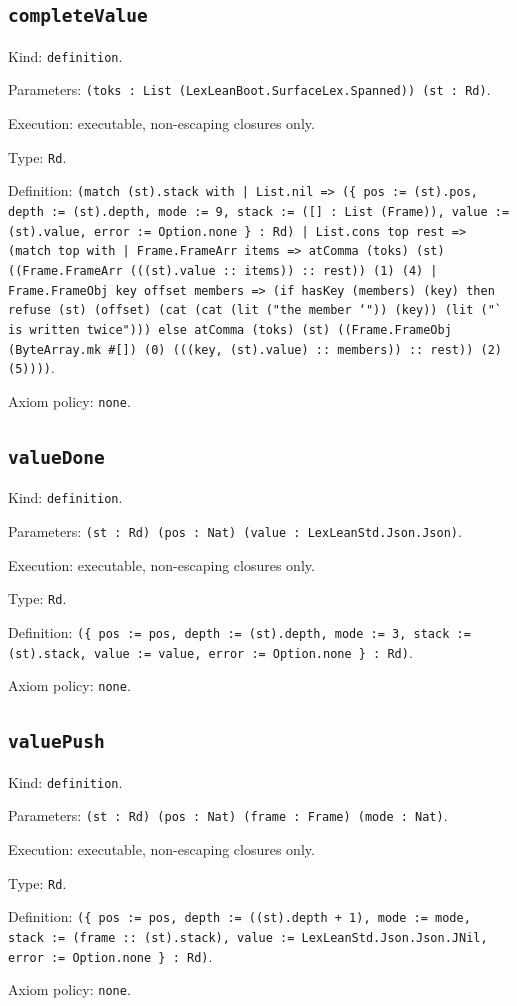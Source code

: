 \documentclass[11pt]{article}
\begin{document}
\subsection*{\texttt{completeValue}}
\noindent Kind: \texttt{definition}.\par
\noindent Parameters: \texttt{(toks : List (LexLeanBoot.SurfaceLex.Spanned)) (st : Rd)}.\par
\noindent Execution: executable, non-escaping closures only.\par
\noindent Type: \texttt{Rd}.\par
\noindent Definition: \texttt{(match (st).stack with | List.nil => (\{ pos := (st).pos, depth := (st).depth, mode := 9, stack := ([] : List (Frame)), value := (st).value, error := Option.none \} : Rd) | List.cons top rest => (match top with | Frame.FrameArr items => atComma (toks) (st) ((Frame.FrameArr (((st).value :: items)) :: rest)) (1) (4) | Frame.FrameObj key offset members => (if hasKey (members) (key) then refuse (st) (offset) (cat (cat (lit ("the member `")) (key)) (lit ("` is written twice"))) else atComma (toks) (st) ((Frame.FrameObj (ByteArray.mk \#[]) (0) (((key, (st).value) :: members)) :: rest)) (2) (5))))}.\par
\noindent Axiom policy: \texttt{none}.\par
\subsection*{\texttt{valueDone}}
\noindent Kind: \texttt{definition}.\par
\noindent Parameters: \texttt{(st : Rd) (pos : Nat) (value : LexLeanStd.Json.Json)}.\par
\noindent Execution: executable, non-escaping closures only.\par
\noindent Type: \texttt{Rd}.\par
\noindent Definition: \texttt{(\{ pos := pos, depth := (st).depth, mode := 3, stack := (st).stack, value := value, error := Option.none \} : Rd)}.\par
\noindent Axiom policy: \texttt{none}.\par
\subsection*{\texttt{valuePush}}
\noindent Kind: \texttt{definition}.\par
\noindent Parameters: \texttt{(st : Rd) (pos : Nat) (frame : Frame) (mode : Nat)}.\par
\noindent Execution: executable, non-escaping closures only.\par
\noindent Type: \texttt{Rd}.\par
\noindent Definition: \texttt{(\{ pos := pos, depth := ((st).depth + 1), mode := mode, stack := (frame :: (st).stack), value := LexLeanStd.Json.Json.JNil, error := Option.none \} : Rd)}.\par
\noindent Axiom policy: \texttt{none}.\par
\end{document}
